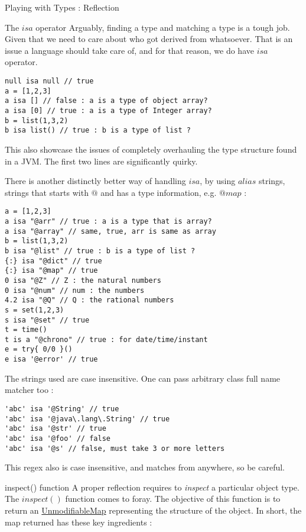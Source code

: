\begin{section}{Playing with Types : Reflection}
\begin{subsection}{The $isa$ operator}
Arguably, finding a type and matching a type is a tough job.
Given that we need to care about who got derived from whatsoever.
That is an issue a language should take care of, and for that reason, 
we do have $isa$ operator.

\begin{lstlisting}[style=JexlStyle]
null isa null // true 
a = [1,2,3] 
a isa [] // false : a is a type of object array?
a isa [0] // true : a is a type of Integer array?
b = list(1,3,2)
b isa list() // true : b is a type of list ? 
\end{lstlisting}
This also showcase the issues of completely overhauling the type 
structure found in a JVM. The first two lines are significantly quirky.

There is another distinctly better way of handling $isa$, by using $alias$ strings,
strings that starts with $@$ and has a type information, e.g. $@map$ :
 
\begin{lstlisting}[style=JexlStyle]
a = [1,2,3] 
a isa "@arr" // true : a is a type that is array?
a isa "@array" // same, true, arr is same as array
b = list(1,3,2)
b isa "@list" // true : b is a type of list ?
{:} isa "@dict" // true 
{:} isa "@map" // true 
0 isa "@Z" // Z : the natural numbers 
0 isa "@num" // num : the numbers 
4.2 isa "@Q" // Q : the rational numbers
s = set(1,2,3)
s isa "@set" // true  
t = time() 
t is a "@chrono" // true : for date/time/instant
e = try{ 0/0 }()
e isa '@error' // true 
\end{lstlisting}
The strings used are case insensitive.
One can pass arbitrary class full name matcher too :
\begin{lstlisting}[style=JexlStyle]
'abc' isa '@String' // true 
'abc' isa '@java\.lang\.String' // true 
'abc' isa '@str' // true 
'abc' isa '@foo' // false 
'abc' isa '@s' // false, must take 3 or more letters
\end{lstlisting}
This regex also is case insensitive, and matches from anywhere, 
so be careful. 
\end{subsection}



\begin{subsection}{inspect() function}
A proper reflection requires to \emph{inspect} a particular object type.
The $inspect()$ function comes to foray. The objective of this function 
is to return an \href{https://docs.oracle.com/javase/8/docs/api/java/util/Collections.html#unmodifiableMap-java.util.Map-}{UnmodifiableMap} 
representing the structure of the object. In short, the map returned has these key ingredients :


\end{subsection}
\end{section}
